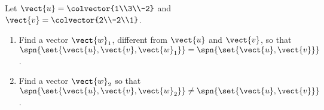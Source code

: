 Let $\vect{u} = \colvector{1\\3\\-2}$ and $\vect{v} = \colvector{2\\-2\\1}$.
\begin{enumerate}
\item Find a vector $\vect{w}_1$, different from $\vect{u}$ and $\vect{v}$,  so that $\spn{\set{\vect{u}, \vect{v}, \vect{w}_1}} = \spn{\set{\vect{u}, \vect{v}}}$.
%
\item Find a vector $\vect{w}_2$ so that $\spn{\set{\vect{u}, \vect{v}, \vect{w}_2}} \ne \spn{\set{\vect{u}, \vect{v}}}$.
\end{enumerate}